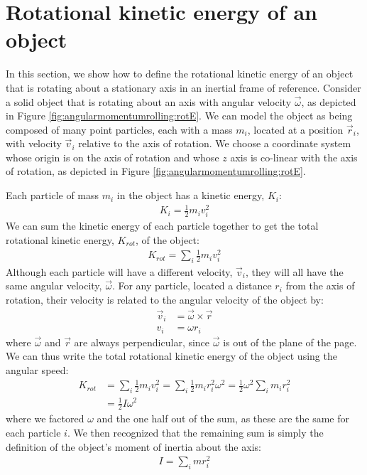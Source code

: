 \section{Rotational kinetic energy of an object}
In this section, we show how to define the rotational kinetic energy of an object that is rotating about a stationary axis in an inertial frame of reference. Consider a solid object that is rotating about an axis with angular velocity $\vec\omega$, as depicted in Figure \ref{fig:angularmomentumrolling:rotE}.
We can model the object as being composed of many point particles, each with a mass $m_i$, located at a position $\vec r_i$, with velocity $\vec v_i$ relative to the axis of rotation. We choose a coordinate system whose origin is on the axis of rotation and whose $z$ axis is co-linear with the axis of rotation, as depicted in Figure \ref{fig:angularmomentumrolling:rotE}.

Each particle of mass $m_i$ in the object has a kinetic energy, $K_i$:
\begin{align*}
K_i = \frac{1}{2}m_iv_i^2
\end{align*} 
We can sum the kinetic energy of each particle together to get the total rotational kinetic energy, $K_{rot}$, of the object:
\begin{align*}
K_{rot} = \sum_i \frac{1}{2}m_iv_i^2
\end{align*}
Although each particle will have a different velocity, $\vec v_i$, they will all have the same angular velocity, $\vec\omega$. For any particle, located a distance $r_i$ from the axis of rotation, their velocity is related to the angular velocity of the object by:
\begin{align*}
\vec v_i &= \vec \omega \times \vec r\\
v_i &= \omega r_i
\end{align*}
where $\vec \omega$ and $\vec r$ are always perpendicular, since $\vec\omega$ is out of the plane of the page. We can thus write the total rotational kinetic energy of the object using the angular speed:
\begin{align*}
K_{rot} &= \sum_i \frac{1}{2}m_iv_i^2 = \sum_i \frac{1}{2}m_ir_i^2\omega^2= \frac{1}{2} \omega^2 \sum_i m_ir_i^2\\
&=\frac{1}{2}I\omega^2
\end{align*}
where we factored $\omega$ and the one half out of the sum, as these are the same for each particle $i$. We then recognized that the remaining sum is simply the definition of the object's moment of inertia about the axis:
\begin{align*}
I = \sum_i mr_i^2
\end{align*}

